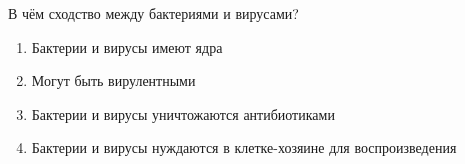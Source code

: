 
В чём сходство между
бактериями и вирусами?

\begin{enumerate}
    \item Бактерии и вирусы имеют ядра
    \item Могут быть вирулентными
    \item Бактерии и вирусы уничтожаются антибиотиками
    \item Бактерии и вирусы нуждаются в клетке-хозяине для воспроизведения
\end{enumerate}




